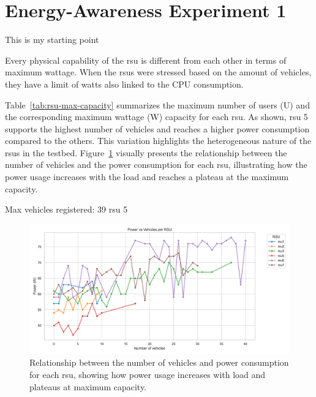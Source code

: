 
\section{Energy-Awareness Experiment 1}\label{awar:1}
This is my starting point \cite{3gpp-ts-22-186,3gpp_ts_26_511_v18_1_0}

Every physical capability of the \gls{rsu} is different from each other in terms of maximum wattage.
When the \glspl{rsu} were stressed based on the amount of vehicles, they have a limit of watts also linked to the CPU consumption.




Table~\ref{tab:rsu-max-capacity} summarizes the maximum number of users (U) and the corresponding maximum wattage (W) capacity for each \gls{rsu}. As shown, \gls{rsu} 5 supports the highest number of vehicles and reaches a higher power consumption compared to the others. This variation highlights the heterogeneous nature of the \glspl{rsu} in the testbed. Figure~\ref{fig:exp1-figure} visually presents the relationship between the number of vehicles and the power consumption for each \gls{rsu}, illustrating how the power usage increases with the load and reaches a plateau at the maximum capacity.

Max vehicles registered: 39 \gls{rsu} 5


\begin{figure}[!htb]
    \centering
    \includegraphics[width=1\columnwidth]{Topics/Energy-Awareness/Figures/power_vehicles_rsu_maximums.pdf}
    \caption{Relationship between the number of vehicles and power consumption for each \gls{rsu}, showing how power usage increases with load and plateaus at maximum capacity.}
    \label{fig:exp1-figure}
\end{figure}